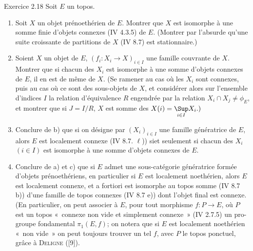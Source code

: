 \begin{enonce*}[remark]{Exercice 2.18}
Soit $E$ un topos.
\begin{enumerate}
\renewcommand{\theenumi}{\alph{enumi}}
\renewcommand{\labelenumi}{\theenumi)}
\item Soit $X$ un objet prénoethérien de $E$. Montrer que $X$ est
  isomorphe à une somme finie d'objets connexes (IV 4.3.5) de
  $E$. (Montrer par l'absurde qu'une suite croissante de partitions de
  $X$ (IV 8.7) est stationnaire.)

\item Soient $X$ un objet de $E$, $(f_i : X_i \to X)_{i \in I}$ une
  famille couvrante de $X$. Montrer que si chacun des $X_i$ est
  isomorphe à une somme d'objets connexes de $E$, il en est de même de
  $X$. (Se ramener au cas où les $X_i$ sont connexes, puis au cas où
  ce sont des sous-objets de $X$, et considérer alors sur l'ensemble
  d'indices $I$ la relation d'équivalence $R$ engendrée par la
  relation $X_i \cap X_j \neq \phi_E$, et montrer que si $J = I/R$,
  $X$ est somme des $X(i) = \displaystyle{\mathop{\Sup}_{i \in I}} X_i
  .)$

\item Conclure de b) que si on désigne par $(X_i)_{i \in I}$ une
  famille génératrice de $E$, alors $E$ est localement connexe (IV
  8.7. $\ell$)) si\pageoriginale et seulement si chacun des $X_i$ $(i \in I)$
  est isomorphe à une somme d'objets connexes de $E$.

\item Conclure de a) et c) que si $E$ admet une sous-catégorie
  génératrice formée d'objets prénoethériens, en particulier si $E$
  est localement noethérien, alors $E$ est localement connexe, et a
  fortiori est isomorphe au topos somme (IV 8.7 b)) d'une famille de
  topos connexes (IV 8.7 e)) \ie dont l'objet final est connexe. (En
  particulier, on peut associer à $E$, pour tout morphisme $f : P \to
  E$, où $P$ est un topos « connexe non vide et simplement
  connexe » (IV 2.7.5) un pro-groupe fondamental $\pi_1(E, f)$; on
  notera que si $E$ est localement noethérien « non vide » on peut
  toujours trouver un tel $f$, avec $P$ le topos ponctuel, grâce à
  \textsc{Deligne} ([9]).
\end{enumerate}
\end{enonce*}

